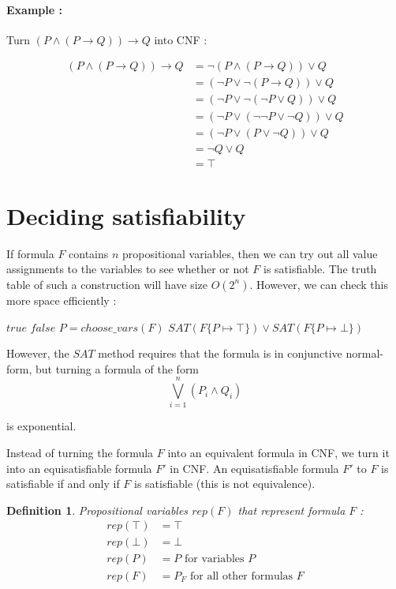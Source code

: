 \documentclass[a4paper,11pt]{report}
\newtheorem*{mydef}{Definition}
\begin{document}
\paragraph{Example :} Turn $(P \wedge (P \to Q)) \to Q$ into CNF :

\begin{align*}
  (P \wedge (P \to Q)) \to Q &= \neg (P \wedge (P \to Q)) \vee Q \\
                             &= (\neg P \vee \neg (P \to Q)) \vee Q\\
                             &= (\neg P \vee \neg (\neg P \vee Q)) \vee Q\\
                             &= (\neg P \vee (\neg \neg P \vee \neg Q)) \vee Q\\
                             &= (\neg P \vee (P \vee \neg Q)) \vee Q\\
                             &= \neg Q \vee Q\\
                             &= \top
\end{align*}

\section{Deciding satisfiability}

If formula $F$ contains $n$ propositional variables, then we can try out all
value assignments to the variables to see whether or not $F$ is satisfiable. The
truth table of such a construction will have size $O(2^n)$. However, we can
check this more space efficiently :

\begin{algorithmic}
  \State \Return $true$
  \State \Return $false$
  \Else
  \State $P = choose\_vars(F)$
  \State \Return $SAT(F\{P \mapsto \top\}) \vee SAT(F\{P \mapsto \bot\})$
  \EndIf
  \EndFunction
\end{algorithmic}

However, the $SAT$ method requires that the formula is in conjunctive
normal-form, but turning a formula of the form
$$
\bigvee_{i=1}^n(P_i \wedge Q_i)
$$

is exponential.

Instead of turning the formula $F$ into an equivalent formula in CNF, we turn it
into an equisatisfiable formula $F'$ in CNF. An equisatisfiable formula $F'$ to
$F$ is satisfiable if and only if $F$ is satisfiable (this is not equivalence).

\begin{mydef}
  Propositional variables $rep(F)$ that represent formula $F$ :
  \begin{align*}
    rep(\top) &= \top \\
    rep(\bot) &= \bot \\
    rep(P) &= P \text{ for variables $P$} \\
    rep(F) &= P_F \text{ for all other formulas $F$}
  \end{align*}
\end{mydef}
\end{document}
